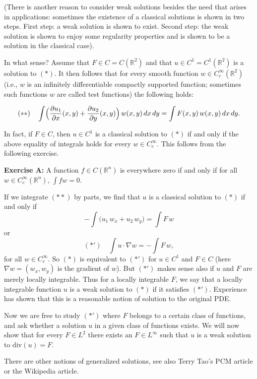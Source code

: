 \documentclass[12pt]{article}
\begin{document}
(There is another reason to consider weak solutions besides the need that arises in applications: sometimes the existence of a classical solutions is shown in two steps. First step: a weak solution is shown to exist. Second step: the weak solution is shown to enjoy some regularity properties and is shown to be a solution in the classical case).

In what sense? Assume that \(F \in C = C(\mathbb{R}^2)\) and that \(u \in C^1 = C^1(\mathbb{R}^2)\) is a solution to \((*)\). It then follows that for every smooth function 
\(w \in C_c^\infty(\mathbb{R}^2)\)
(i.e., \(w\) is an infinitely differentiable compactly supported function; sometimes such functions \(w\) are called test functions) the following holds:

\[
(**) \quad 
\int \Bigl(\frac{\partial u_1}{\partial x}(x,y) + \frac{\partial u_2}{\partial y}(x,y)\Bigr)\, w(x,y)\, dx\,dy 
= \int F(x,y)\, w(x,y)\, dx\,dy.
\]

In fact, if \(F \in C\), then \(u \in C^1\) is a classical solution to \((*)\) if and only if the above equality of integrals holds for every \(w \in C_c^\infty\). This follows from the following exercise.

\medskip
\noindent
\textbf{Exercise A:} A function \(f \in C(\mathbb{R}^n)\) is everywhere zero if and only if for all \(w \in C_c^\infty(\mathbb{R}^n)\), \(\int f w = 0\).

\medskip

If we integrate \((**)\) by parts, we find that \(u\) is a classical solution to \((*)\) if and only if
\[
- \int \bigl(u_1\, w_x + u_2\, w_y\bigr) 
= \int F\, w
\]
or
\[
(*') \quad \int u \cdot \nabla w = -\int F\, w,
\]
for all \(w \in C_c^\infty\). So \((*)\) is equivalent to \((*')\) for \(u \in C^1\) and \(F \in C\) (here \(\nabla w = (w_x, w_y)\) is the gradient of \(w\)). But \((*')\) makes sense also if \(u\) and \(F\) are merely locally integrable. Thus for a locally integrable \(F\), we say that a locally integrable function \(u\) is a weak solution to \((*)\) if it satisfies \((*')\). Experience has shown that this is a reasonable notion of solution to the original PDE.

Now we are free to study \((*')\) where \(F\) belongs to a certain class of functions, and ask whether a solution \(u\) in a given class of functions exists. We will now show that for every \(F \in L^2\) there exists an \(F \in L^\infty\) such that \(u\) is a weak solution to \(\mathrm{div}(u) = F\).

There are other notions of generalized solutions, see also Terry Tao’s PCM article or the Wikipedia article.
\end{document}
